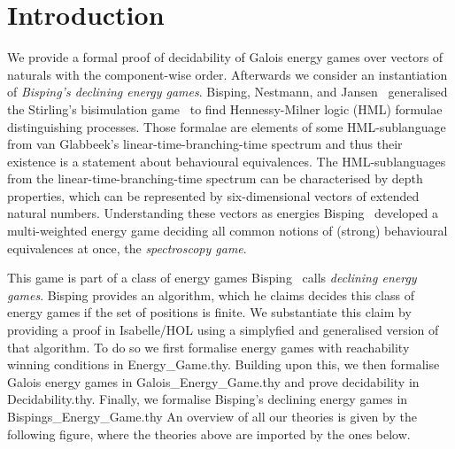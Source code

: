 \newpage
\section{Introduction}
 
\noindent
We provide a formal proof of decidability of Galois energy games over vectors of naturals with the component-wise order. 
Afterwards we consider an instantiation of \textit{Bisping's declining energy games}.
Bisping, Nestmann, and Jansen~\cite{bispingNestmann,bispingJansenNestmann} generalised the 
Stirling's bisimulation game~\cite{stirling-bisim} to find Hennessy-Milner logic (HML) formulae distinguishing 
processes. Those formalae are elements of some HML-sublanguage from 
van Glabbeek’s linear-time-branching-time spectrum\cite{vanGlabbeek} 
and thus their existence is a statement about behavioural equivalences.
The HML-sublanguages from the linear-time-branching-time spectrum can be characterised by depth properties, 
which can be represented by six-dimensional vectors of extended natural numbers. Understanding these 
vectors as energies Bisping~\cite{bens-algo} developed a multi-weighted energy game deciding all common 
notions of (strong) behavioural equivalences at once, the \textit{spectroscopy game}. 

This game is part of a class of energy games Bisping~\cite{bens-algo} calls \textit{declining energy games}.
Bisping provides an algorithm, which he claims decides this class of energy games if the set of positions is finite.
We substantiate this claim by providing a proof in Isabelle/HOL using a simplyfied and generalised version of that algorithm.
To do so we first formalise energy games with reachability winning conditions in Energy\_Game.thy. 
Building upon this, we then formalise Galois energy games in Galois\_Energy\_Game.thy and prove decidability in Decidability.thy.
Finally, we formalise Bisping's declining energy games in Bispings\_Energy\_Game.thy
An overview of all our theories is given by the following figure, where the theories above are imported by the ones below.


